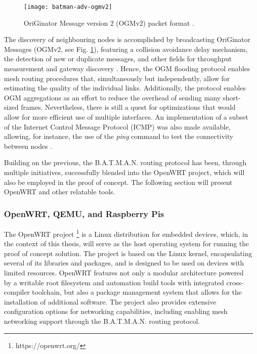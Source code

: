 \begin{figure} [ht]
  \begin{center}
  \texttt{[image: batman-adv-ogmv2]}
  \caption{OriGinator Message version 2 (OGMv2) packet format \cite{cilfone2019wireless,open-mesh-ogmv2}.}
  \label{fig:batman-adv-ogmv2}
  \end{center}
\end{figure}

The discovery of neighbouring nodes is accomplished by broadcasting OriGinator Messages (OGMv2, see Fig. \ref{fig:batman-adv-ogmv2}), featuring a collision avoidance delay mechanism, the detection of new or duplicate messages, and other fields for throughput measurement and gateway discovery \cite{cilfone2019wireless}. Hence, the OGM flooding protocol enables mesh routing procedures that, simultaneously but independently, allow for estimating the quality of the individual links. Additionally, the protocol enables OGM aggregations as an effort to reduce the overhead of sending many short-sized frames. Nevertheless, there is still a quest for optimizations that would allow for more efficient use of multiple interfaces. An implementation of a subset of the Internet Control Message Protocol (ICMP) was also made available, allowing, for instance, the use of the \emph{ping} command to test the connectivity between nodes \cite{seither2011routing}.

Building on the previous, the B.A.T.M.A.N. routing protocol has been, through multiple initiatives, successfully blended into the OpenWRT project, which will also be employed in the proof of concept. The following section will present OpenWRT and other relatable tools.

\subsubsection{OpenWRT, QEMU, and Raspberry Pis}

The OpenWRT project \footnote{https://openwrt.org/} is a Linux distribution for embedded devices, which, in the context of this thesis, will serve as the host operating system for running the proof of concept solution. The project is based on the Linux kernel, encapsulating several of its libraries and packages, and is designed to be used on devices with limited resources. OpenWRT features not only a modular architecture powered by a writable root filesystem and automation build tools with integrated cross-compiler toolchain, but also a package management system that allows for the installation of additional software. The project also provides extensive configuration options for networking capabilities, including enabling mesh networking support through the B.A.T.M.A.N. routing protocol. 

